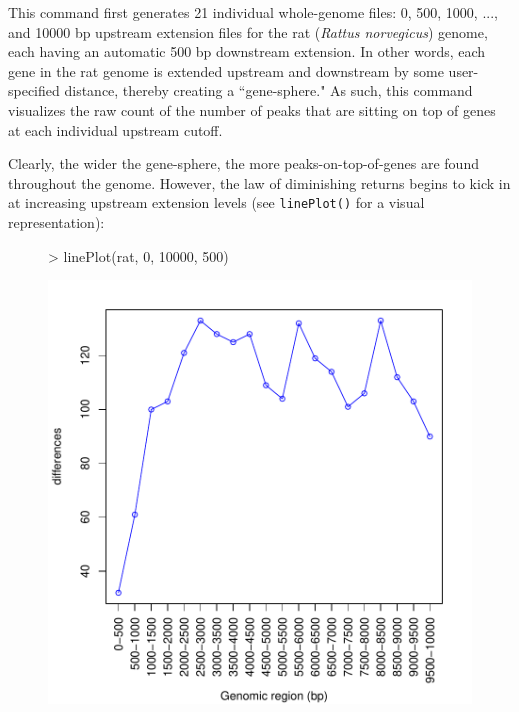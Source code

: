 \documentclass[12pt]{article}
\begin{document}
This command first generates 21 individual whole-genome files: 0, 500, 1000, ..., and 10000 bp upstream extension files for the rat (\emph{Rattus norvegicus}) genome, each having an automatic 500 bp downstream extension.  In other words, each gene in the rat genome is extended upstream and downstream by some user-specified distance, thereby creating a ``gene-sphere."  As such, this command visualizes the raw count of the number of peaks that are sitting on top of genes at each individual upstream cutoff.

Clearly, the wider the gene-sphere, the more peaks-on-top-of-genes are found throughout the genome.  However, the law of diminishing returns begins to kick in at increasing upstream extension levels (see \texttt{linePlot()} for a visual representation):

\begin{figure}[H]
\begin{center}
\begin{Schunk}
\begin{Sinput}
> linePlot(rat, 0, 10000, 500)
\end{Sinput}
\end{Schunk}
\includegraphics{geneXtendeR-007}
\end{center}
\end{figure}
\end{document}
